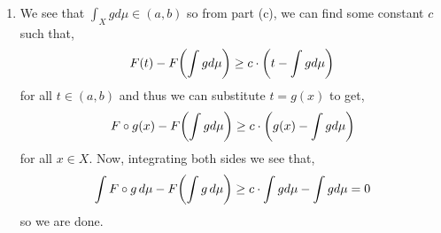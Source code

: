 \documentclass[12pt,a4paper]{article}
\begin{document}
\begin{solution}
\begin{enumerate}[label=\alph*.]
        The conclusion follows just as we did in part (b), we show part of it. 
        \[
            F'(t_0+)=\lim_{h\searrow 0}\frac{F(t_0+h)-F(t_0)}{h}\leq\frac{F(y)-F(t_0)}{y-t_0}
        \]
        for any $y>t_0$ as $t_0+h<y$ eventually. 
    \item We see that $\int_Xgd\mu\in(a,b)$ so from part (c), we can find some constant $c$ such that,
        \[
            F(t)-F\qty(\int gd\mu)\geq c\cdot\qty(t-\int gd\mu)
        \]
        for all $t\in(a,b)$ and thus we can substitute $t=g(x)$ to get,
        \[
            F\circ g(x)-F\qty(\int gd\mu)\geq c\cdot\qty(g(x)-\int gd\mu)
        \]
        for all $x\in X.$ 
        Now, integrating both sides we see that,
        \[
            \int F\circ g\,d\mu-F\qty(\int g\,d\mu)\geq c\cdot\int gd\mu-\int gd\mu=0
        \]
        so we are done.
\end{enumerate}
\end{solution}
\end{document}
